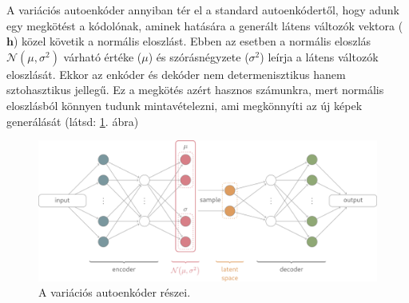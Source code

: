 

A variációs autoenkóder annyiban tér el a standard autoenkódertől, hogy adunk egy megkötést a kódolónak, aminek hatására a generált látens változók vektora ($\textbf{h}$) közel követik a normális eloszlást. Ebben az esetben a normális eloszlás $\mathcal{N}(\mu,\sigma^2)$ várható értéke ($\mu$) és szórásnégyzete ($\sigma^2$) leírja a látens változók eloszlását. Ekkor az enkóder és dekóder nem determenisztikus hanem sztohasztikus jellegű. Ez a megkötés azért hasznos számunkra, mert normális eloszlásból könnyen tudunk mintavételezni, ami megkönnyíti az új képek generálását (látsd: \ref{fig:vae}. ábra)

\begin{figure}[ht]
	\centering
	\includegraphics[width=1\columnwidth]{figures/vae.png}
	\caption{A variációs autoenkóder részei.}
	\label{fig:vae}
\end{figure}



